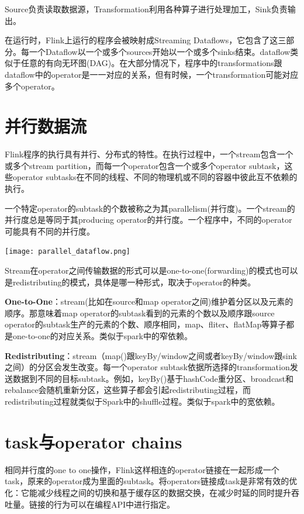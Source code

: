 \documentclass[oneside]{ctexbook}
\begin{document}
Source负责读取数据源，Transformation利用各种算子进行处理加工，Sink负责输出。

在运行时，Flink上运行的程序会被映射成Streaming Dataflows，它包含了这三部分。每一个Dataflow以一个或多个sources开始以一个或多个sinks结束。dataflow类似于任意的有向无环图(DAG)。在大部分情况下，程序中的transformations跟dataflow中的operator是一一对应的关系，但有时候，一个transformation可能对应多个operator。

\section{并行数据流}

Flink程序的执行具有并行、分布式的特性。在执行过程中，一个stream包含一个或多个stream partition，而每一个operator包含一个或多个operator subtask，这些operator subtasks在不同的线程、不同的物理机或不同的容器中彼此互不依赖的执行。

一个特定operator的subtask的个数被称之为其parallelism(并行度)。一个stream的并行度总是等同于其producing operator的并行度。一个程序中，不同的operator可能具有不同的并行度。

\noindent \texttt{[image: parallel\_dataflow.png]}

Stream在operator之间传输数据的形式可以是one-to-one(forwarding)的模式也可以是redistributing的模式，具体是哪一种形式，取决于operator的种类。

\textbf{One-to-One}：stream(比如在source和map operator之间)维护着分区以及元素的顺序。那意味着map operator的subtask看到的元素的个数以及顺序跟source operator的subtask生产的元素的个数、顺序相同，map、fliter、flatMap等算子都是one-to-one的对应关系。类似于spark中的窄依赖。

\sloppy
\textbf{Redistributing}：stream（map()跟keyBy/window之间或者keyBy/window跟sink之间）的分区会发生改变。每一个operator subtask依据所选择的transformation发送数据到不同的目标subtask。例如，keyBy()基于hashCode重分区、broadcast和rebalance会随机重新分区，这些算子都会引起redistributing过程，而redistributing过程就类似于Spark中的shuffle过程。类似于spark中的宽依赖。

\section{task与operator chains}

相同并行度的one to one操作，Flink这样相连的operator链接在一起形成一个task，原来的operator成为里面的subtask。将operators链接成task是非常有效的优化：它能减少线程之间的切换和基于缓存区的数据交换，在减少时延的同时提升吞吐量。链接的行为可以在编程API中进行指定。
\end{document}
